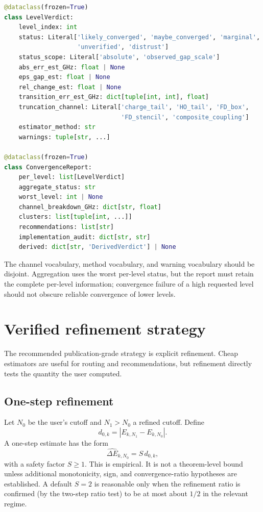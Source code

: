 \documentclass[11pt,a4paper]{article}
\newcommand{\abs}[1]{\left|#1\right|}
\newcommand{\errhat}{\widehat{\Delta E}}
\begin{document}
\begin{lstlisting}[language=Python]
@dataclass(frozen=True)
class LevelVerdict:
    level_index: int
    status: Literal['likely_converged', 'maybe_converged', 'marginal',
                    'unverified', 'distrust']
    status_scope: Literal['absolute', 'observed_gap_scale']
    abs_err_est_GHz: float | None
    eps_gap_est: float | None
    rel_change_est: float | None
    transition_err_est_GHz: dict[tuple[int, int], float]
    truncation_channel: Literal['charge_tail', 'HO_tail', 'FD_box',
                                'FD_stencil', 'composite_coupling']
    estimator_method: str
    warnings: tuple[str, ...]

@dataclass(frozen=True)
class ConvergenceReport:
    per_level: list[LevelVerdict]
    aggregate_status: str
    worst_level: int | None
    channel_breakdown_GHz: dict[str, float]
    clusters: list[tuple[int, ...]]
    recommendations: list[str]
    implementation_audit: dict[str, str]
    derived: dict[str, 'DerivedVerdict'] | None
\end{lstlisting}

The channel vocabulary, method vocabulary, and warning vocabulary should be disjoint.  Aggregation uses the worst per-level status, but the report must retain the complete per-level information; convergence failure of a high requested level should not obscure reliable convergence of lower levels.

\section{Verified refinement strategy}
\label{sec:verified}

The recommended publication-grade strategy is explicit refinement.  Cheap estimators are useful for routing and recommendations, but refinement directly tests the quantity the user computed.

\subsection{One-step refinement}

Let $N_0$ be the user's cutoff and $N_1>N_0$ a refined cutoff.  Define
\begin{equation}
  d_{0,k}=\abs{E_{k,N_1}-E_{k,N_0}}.
\end{equation}
A one-step estimate has the form
\begin{equation}
  \errhat_{k,N_0}=S\,d_{0,k},
\end{equation}
with a safety factor $S\ge 1$.  This is empirical.  It is not a theorem-level bound unless additional monotonicity, sign, and convergence-ratio hypotheses are established.  A default $S=2$ is reasonable only when the refinement ratio is confirmed (by the two-step ratio test) to be at most about $1/2$ in the relevant regime.
\end{document}

